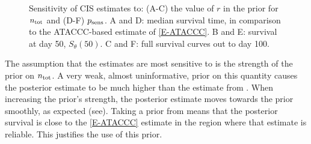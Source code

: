 \documentclass[thesis.tex]{subfiles}
\begin{document}
\begin{figure}
  \vspace{-2.5cm}
  \caption{%
    Sensitivity of CIS estimates to: (A-C) the value of $r$ in the prior for $n_\text{tot}$ and (D-F) $p_\text{sens}$.
    A and D: median survival time, in comparison to the ATACCC-based estimate of \cref{E-ATACCC}.
    B and E: survival at day 50, $S_\theta(50)$.
    C and F: full survival curves out to day 100.
  }
  \label{imperf-test:fig:cis-sensitivity}
\end{figure}

The assumption that the estimates are most sensitive to is the strength of the prior on $n_\text{tot}$.
A very weak, almost uninformative, prior on this quantity causes the posterior estimate to be much higher than the estimate from \textcite{birrellRTM2}.
When increasing the prior's strength, the posterior estimate moves towards the prior smoothly, as expected (see).
Taking a prior from \textcite{birrellRTM2} means that the posterior survival is close to the \cref{E-ATACCC} estimate in the region where that estimate is reliable.
This justifies the use of this prior.
\end{document}

